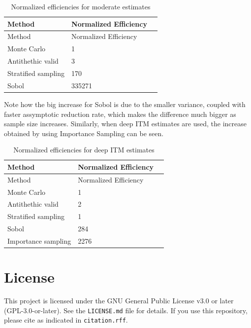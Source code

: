 \documentclass[11pt,oneside,parskip=half]{scrbook}  %
\begin{document}
\begin{table}[H]
\centering
\caption{Normalized efficiencies for moderate estimates}
\begin{tabularx}{0.8\textwidth}{lXr}
\toprule
\textbf{Method} & \textbf{Normalized Efficiency}\\
\midrule
Method  & Normalized Efficiency\\
Monte Carlo & 1\\
Antithethic valid & 3\\
Stratified sampling & 170\\
Sobol & 335271\\
\bottomrule
\end{tabularx}
\end{table}


Note how the big increase for Sobol is due to the smaller variance, coupled with faster assymptotic reduction rate, which makes the difference much bigger as sample size increases. Similarly, when deep ITM estimates are used, the increase obtained by using Importance Sampling can be seen.

\begin{table}[H]
\centering
\caption{Normalized efficiencies for deep ITM estimates}
\begin{tabularx}{0.8\textwidth}{lXr}
\toprule
\textbf{Method} & \textbf{Normalized Efficiency}\\
\midrule
Method  & Normalized Efficiency\\
Monte Carlo & 1\\
Antithethic valid & 2\\
Stratified sampling & 1\\
Sobol & 284\\
Importance sampling & 2276\\
\bottomrule
\end{tabularx}
\end{table}

\backmatter

\chapter*{License}

This project is licensed under the GNU General Public License v3.0 or later (GPL-3.0-or-later). See the \texttt{LICENSE.md} file for details. If you use this repository, please cite as indicated in \texttt{citation.rff}.
\end{document}
